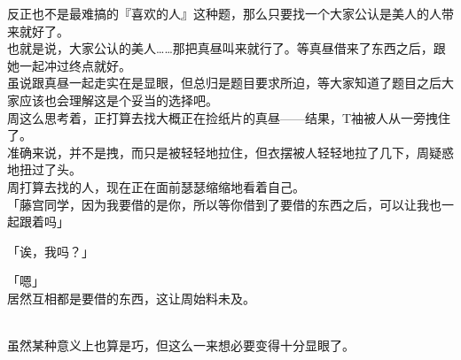 反正也不是最难搞的『喜欢的人』这种题，那么只要找一个大家公认是美人的人带来就好了。\\

也就是说，大家公认的美人……那把真昼叫来就行了。等真昼借来了东西之后，跟她一起冲过终点就好。\\

虽说跟真昼一起走实在是显眼，但总归是题目要求所迫，等大家知道了题目之后大家应该也会理解这是个妥当的选择吧。\\

周这么思考着，正打算去找大概正在捡纸片的真昼——结果，T袖被人从一旁拽住了。\\

准确来说，并不是拽，而只是被轻轻地拉住，但衣摆被人轻轻地拉了几下，周疑惑地扭过了头。\\

周打算去找的人，现在正在面前瑟瑟缩缩地看着自己。\\

「藤宫同学，因为我要借的是你，所以等你借到了要借的东西之后，可以让我也一起跟着吗」

「诶，我吗？」

「嗯」\\

居然互相都是要借的东西，这让周始料未及。\\\

虽然某种意义上也算是巧，但这么一来想必要变得十分显眼了。

